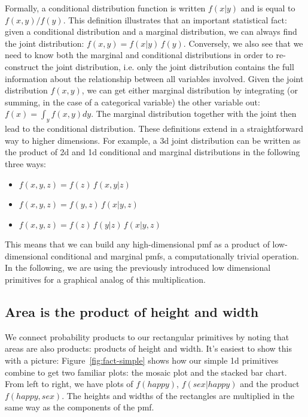 \documentclass[journal]{vgtc}
\begin{document}
Formally, a conditional distribution function is written $f(x | y)$ and is equal to $f(x, y) / f(y)$. This definition illustrates that an important statistical fact: given a conditional distribution and a marginal distribution, we can always find the joint distribution: $f(x, y) = f(x | y)\,f(y)$\footnotemark. 
Conversely, we also see that we need to know both the marginal and conditional distributions in order to re-construct the joint distribution, i.e. only the joint distribution contains the full information about the relationship between all variables involved. Given the joint distribution $f(x,y)$, we can get either marginal distribution  by integrating (or summing, in the case of a categorical variable)  the other variable out: $f(x) = \int_y f(x,y) dy$. The marginal distribution together with the joint then lead to the conditional distribution. 
These definitions extend in a straightforward way to higher dimensions. For example, a 3d joint distribution can be written as the product of 2d and 1d conditional and marginal distributions in the following three ways:

\begin{itemize}
  \setlength{\itemsep}{0em}
  \item $f(x, y, z) = f(z)\,f(x, y | z)$
  \item $f(x, y, z) = f(y, z)\,f(x | y, z) $
  \item $f(x, y, z) = f(z)\,f(y | z)\,f(x | y, z)$
\end{itemize}


This means that we can build any high-dimensional {\sc pmf} as a product of low-dimensional conditional and marginal {\sc pmf}s, a computationally trivial operation. In the following, we are using the previously introduced low dimensional primitives  for a graphical analog of this multiplication. 

\subsection{Area is the product of height and width}

We connect probability products to our rectangular primitives by noting that areas are also products: products of height and width. It's easiest to show this with a picture: Figure~\ref{fig:fact-simple} shows how our simple 1d primitives combine to get two familiar plots: the mosaic plot and the stacked bar chart. From left to right, we have plots of $f(happy)$, $f(sex | happy)$ and the product $f(happy, sex)$. The heights and widths of the rectangles are multiplied in the same way as the components of the {\sc pmf}.
\end{document}
